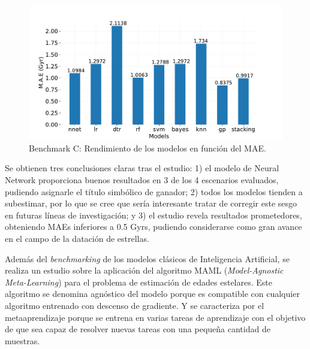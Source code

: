 \begin{figure}[H]
\begin{center}
 \includegraphics[width=0.8\linewidth]{Figuras/Experimentos/B_C_models.pdf}
\end{center}
\caption{Benchmark C: Rendimiento de los modelos en función del MAE.}
 \label{fig:benchC_intro}
\end{figure}

\begin{table}[H]
\centering
{}%
\caption{Edad estimada para el Sol en Gyr. El método más preciso es rf. }\label{table:sun_results_intro}
\end{table}

\vspace{0.5cm}

Se obtienen tres conclusiones claras tras el estudio: 1) el modelo de Neural Network proporciona buenos resultados en 3 de los 4 escenarios evaluados, pudiendo asignarle el título simbólico de ganador; 2) todos los modelos tienden a subestimar, por lo que se cree que sería interesante tratar de corregir este sesgo en futuras líneas de investigación; y 3) el estudio revela resultados prometedores, obteniendo MAEs inferiores a 0.5 Gyrs, pudiendo considerarse como gran avance en el campo de la datación de estrellas.

\vspace{0.25cm}
Además del \emph{benchmarking} de los modelos clásicos de Inteligencia Artificial, se realiza un estudio sobre la aplicación del algoritmo MAML (\emph{Model-Agnostic Meta-Learning}) \cite{finn2017modelagnostic} para el problema de estimación de edades estelares. Este algoritmo se denomina agnóstico del modelo porque es compatible con cualquier algoritmo entrenado con descenso de gradiente. Y se caracteriza por el metaaprendizaje porque se entrena en varias tareas de aprendizaje con el objetivo de que sea capaz de resolver nuevas tareas con una pequeña cantidad de muestras.

